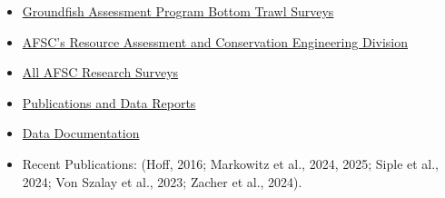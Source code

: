 \documentclass[
  letterpaper,
  oneside,
  open=any]{scrbook}
\providecommand{\tightlist}{%
  \setlength{\itemsep}{0pt}\setlength{\parskip}{0pt}}\usepackage{longtable,booktabs,array}
\begin{document}
\begin{itemize}
\tightlist
\item
  \href{https://www.fisheries.noaa.gov/alaska/science-data/groundfish-assessment-program-bottom-trawl-surveys}{Groundfish
  Assessment Program Bottom Trawl Surveys}
\item
  \href{https://www.fisheries.noaa.gov/about/resource-assessment-and-conservation-engineering-division}{AFSC's
  Resource Assessment and Conservation Engineering Division}
\item
  \href{https://www.fisheries.noaa.gov/alaska/ecosystems/alaska-fish-research-surveys}{All
  AFSC Research Surveys}
\item
  \href{https://repository.library.noaa.gov/}{Publications and Data
  Reports}
\item
  \href{https://afsc-gap-products.github.io/gap_products/}{Data
  Documentation}
\item
  Recent Publications: (Hoff, 2016; Markowitz et al., 2024, 2025; Siple
  et al., 2024; Von Szalay et al., 2023; Zacher et al., 2024).
\end{itemize}
\end{document}
